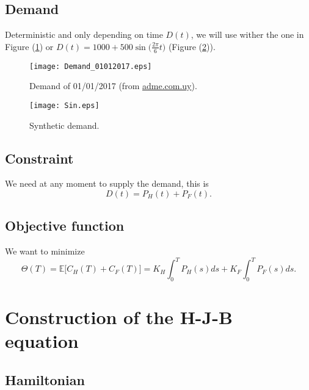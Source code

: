 \documentclass[12pt]{article}
\theoremstyle{definition}
\theoremstyle{remark}
\newcommand{\E}{\mathbb{E}}
\begin{document}
\subsection{Demand}

Deterministic and only depending on time $D(t)$, we will use wither the one in Figure (\ref{Demand01012017}) or $D(t)=1000+500\sin\big(\frac{2\pi}{6}t\big)$ (Figure (\ref{Sin})).
\begin{figure}[ht!]
\centering
\texttt{[image: Demand\_01012017.eps]}
\caption{Demand of 01/01/2017 (from \href{adme.com.uy}{adme.com.uy}).}
\label{Demand01012017}
\end{figure}
\begin{figure}[ht!]
\centering
\texttt{[image: Sin.eps]}
\caption{Synthetic demand.}
\label{Sin}
\end{figure}

\subsection{Constraint}

We need at any moment to supply the demand, this is
\begin{equation*}
D(t)=P_H(t)+P_F(t).
\end{equation*}

\subsection{Objective function}

We want to minimize
\begin{equation*}
\Theta(T)=\E\Big[C_H(T)+C_F(T)\Big]=K_H\int_0^TP_H(s)ds+K_F\int_0^TP_F(s)ds.
\end{equation*}

\section{Construction of the H-J-B equation}

\subsection{Hamiltonian}
\end{document}

